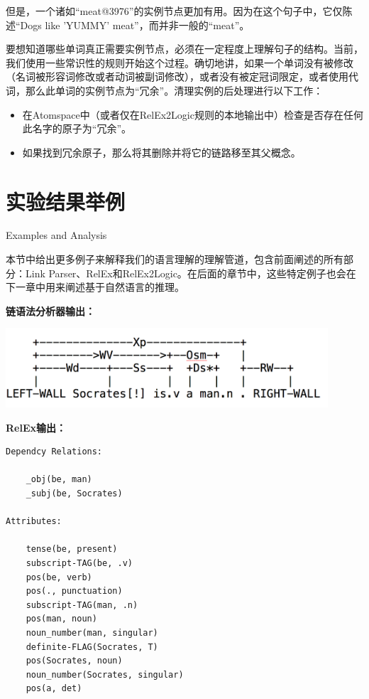 但是，一个诸如“meat@3976”的实例节点更加有用。因为在这个句子中，它仅陈述“Dogs like ’YUMMY’ meat”，而并非一般的“meat”。

要想知道哪些单词真正需要实例节点，必须在一定程度上理解句子的结构。当前，我们使用一些常识性的规则开始这个过程。确切地讲，如果一个单词没有被修改（名词被形容词修改或者动词被副词修改），或者没有被定冠词限定，或者使用代词，那么此单词的实例节点为“冗余”。清理实例的后处理进行以下工作：

\begin{itemize}
\item 在Atomspace中（或者仅在RelEx2Logic规则的本地输出中）检查是否存在任何此名字的原子为“冗余”。
\item 如果找到冗余原子，那么将其删除并将它的链路移至其父概念。
\end{itemize}

\section{实验结果举例}{Examples and Analysis}  

本节中给出更多例子来解释我们的语言理解的理解管道，包含前面阐述的所有部分：Link Parser、RelEx和RelEx2Logic。在后面的章节中，这些特定例子也会在下一章中用来阐述基于自然语言的推理。



{\bf 链语法分析器输出：}

\includegraphics[width=12cm]{figures/Socrates_1.png}

{\bf RelEx输出：}

\begin{verbatim}
Dependcy Relations:

    _obj(be, man)
    _subj(be, Socrates)

Attributes:

    tense(be, present)
    subscript-TAG(be, .v)
    pos(be, verb)
    pos(., punctuation)
    subscript-TAG(man, .n)
    pos(man, noun)
    noun_number(man, singular)
    definite-FLAG(Socrates, T)
    pos(Socrates, noun)
    noun_number(Socrates, singular)
    pos(a, det)

\end{verbatim}

